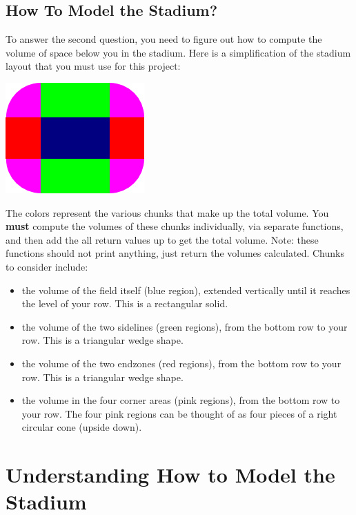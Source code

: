 \documentclass[12pt]{article}
\begin{document}
\subsection*{How To Model the Stadium?}

To answer the second question,
you need to figure out how to compute the volume of space below you in the
stadium.  Here is a simplification of the stadium layout that
you must use for this project:

\begin{center}
\W{}
\T\includegraphics{top-view.png}
\end{center}

The colors represent the various chunks that make up the total
volume.
You {\bf must} compute the volumes of these chunks
individually, via separate functions, and then add the
all return values up to get the total
volume.  Note: these functions should not print anything, just
return the volumes calculated. Chunks to consider include:

\begin{itemize}
\item the volume of the field itself (blue region),
extended vertically until it reaches the level of your row.  This is a
rectangular solid.
\item the volume of the two sidelines (green regions),
from the bottom row to your row.  This is a triangular wedge shape.
\item the volume of the two endzones (red regions),
from the bottom row to your row.  This is a triangular wedge shape.
\item the volume in the four corner areas (pink regions),
from the bottom row to your row.  The four pink regions can be
thought of as four pieces of a right circular cone (upside down).
\end{itemize}

\section*{Understanding How to Model the Stadium}
\end{document}
